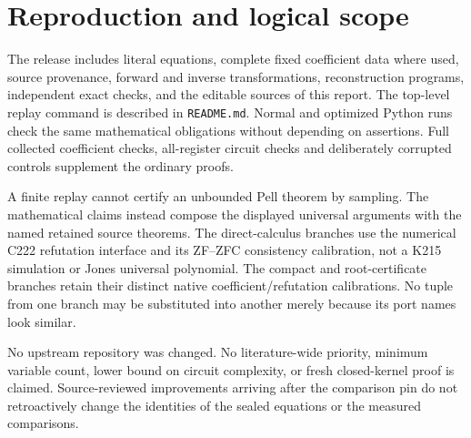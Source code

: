 \documentclass[11pt]{article}
\theoremstyle{definition}\newtheorem{definition}[theorem]{Definition}
\theoremstyle{remark}\newtheorem{remark}[theorem]{Remark}
\begin{document}





\section{Reproduction and logical scope}
The release includes literal equations, complete fixed coefficient data
where used, source provenance, forward and inverse transformations,
reconstruction programs, independent exact checks, and the editable
sources of this report. The top-level replay command is described in
\texttt{README.md}. Normal and optimized Python runs check the same
mathematical obligations without depending on assertions. Full collected
coefficient checks, all-register circuit checks and deliberately corrupted
controls supplement the ordinary proofs.

A finite replay cannot certify an unbounded Pell theorem by sampling.
The mathematical claims instead compose the displayed universal arguments
with the named retained source theorems. The direct-calculus branches use
the numerical C222 refutation interface and its ZF--ZFC consistency
calibration, not a K215 simulation or Jones universal polynomial. The
compact and root-certificate branches retain their distinct native
coefficient/refutation calibrations. No tuple from one branch may be
substituted into another merely because its port names look similar.

No upstream repository was changed. No literature-wide priority,
minimum variable count, lower bound on circuit complexity, or fresh
closed-kernel proof is claimed. Source-reviewed improvements arriving
after the comparison pin do not retroactively change the identities of
the sealed equations or the measured comparisons.
\appendix

\end{document}
